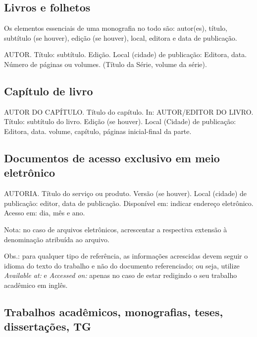 
\subsection{Livros e folhetos}

Os elementos essenciais de uma monografia no todo são: autor(es), título, subtítulo (se houver), edição (se houver), local, editora e data de publicação.

AUTOR. Título: subtítulo. Edição. Local (cidade) de publicação: Editora, data. Número de páginas ou volumes. (Título da Série, volume da série).



\subsection{Capítulo de livro}

AUTOR DO CAPÍTULO. Título do capítulo. In: AUTOR/EDITOR DO LIVRO. Título: subtítulo do livro. Edição (se houver). Local (Cidade) de publicação: Editora, data. volume, capítulo, páginas inicial-final da parte.



\subsection{Documentos de acesso exclusivo em meio eletrônico}

AUTORIA. Título do serviço ou produto. Versão (se houver). Local (cidade) de publicação: editor, data de publicação. Disponível em: indicar endereço eletrônico. Acesso em: dia, mês e ano.

Nota: no caso de arquivos eletrônicos, acrescentar a respectiva extensão à denominação atribuída ao arquivo.

Obs.: para qualquer tipo de referência, as informações acrescidas devem seguir o idioma do texto do trabalho e não do documento referenciado; ou seja, utilize \textit{Available at:} e \textit{Accessed on:} apenas no caso de estar redigindo o seu trabalho acadêmico em inglês.



\subsection{Trabalhos acadêmicos, monografias, teses, dissertações, TG}

